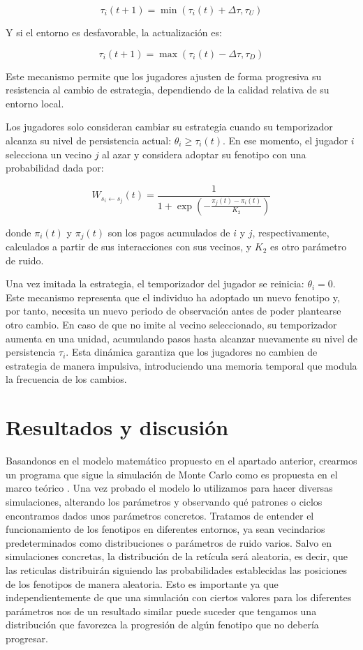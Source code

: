 \documentclass[a4paper,12pt]{report}
\begin{document}
\[
\tau_i(t+1) = \min(\tau_i(t) + \Delta\tau, \tau_U)
\]

Y si el entorno es desfavorable, la actualización es:

\[
\tau_i(t+1) = \max(\tau_i(t) - \Delta\tau, \tau_D)
\]

Este mecanismo permite que los jugadores ajusten de forma progresiva su resistencia al cambio de estrategia, dependiendo de la calidad relativa de su entorno local.

Los jugadores solo consideran cambiar su estrategia cuando su temporizador alcanza su nivel de persistencia actual: \( \theta_i \geq \tau_i(t) \). En ese momento, el jugador \( i \) selecciona un vecino \( j \) al azar y considera adoptar su fenotipo con una probabilidad dada por:

\[
W_{s_i \leftarrow s_j}(t) = \frac{1}{1 + \exp\left( -\frac{ \pi_j(t) - \pi_i(t) }{K_2} \right)}
\]

donde \( \pi_i(t) \) y \( \pi_j(t) \) son los pagos acumulados de \( i \) y \( j \), respectivamente, calculados a partir de sus interacciones con sus vecinos, y \( K_2 \) es otro parámetro de ruido.

Una vez imitada la estrategia, el temporizador del jugador se reinicia: \( \theta_i = 0 \). Este mecanismo representa que el individuo ha adoptado un nuevo fenotipo y, por tanto, necesita un nuevo periodo de observación antes de poder plantearse otro cambio. En caso de que no imite al vecino seleccionado, su temporizador aumenta en una unidad, acumulando pasos hasta alcanzar nuevamente su nivel de persistencia \( \tau_i \). Esta dinámica garantiza que los jugadores no cambien de estrategia de manera impulsiva, introduciendo una memoria temporal que modula la frecuencia de los cambios.


\chapter{Resultados y discusión}

Basandonos en el modelo matemático propuesto en el apartado anterior, crearmos un programa que sigue la simulación de Monte Carlo como es propuesta en el marco teórico \cite{TFG_SimulacionAgentesFenotipos}.
Una vez probado el modelo lo utilizamos para hacer diversas simulaciones, alterando los parámetros y observando qué patrones o ciclos encontramos dados unos parámetros concretos.
Tratamos de entender el funcionamiento de los fenotipos en diferentes entornos, ya sean vecindarios predeterminados como distribuciones o parámetros de ruido varios.
Salvo en simulaciones concretas, la distribución de la retícula será aleatoria, es decir, que las reticulas distribuirán siguiendo las probabilidades establecidas las posiciones de los fenotipos de manera aleatoria. Esto es importante ya que independientemente de que una simulación con ciertos valores para los diferentes parámetros nos de un resultado similar puede suceder que tengamos una distribución que favorezca la progresión de algún fenotipo que no debería progresar.
\end{document}
